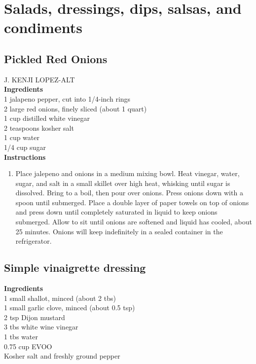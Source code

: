 \documentclass{article}
\numberwithin{figure}{section}
\numberwithin{equation}{section}
\begin{document}
\pagebreak
\section{Salads, dressings, dips, salsas, and condiments}

\pagebreak
\subsection{Pickled Red Onions}
J. KENJI LOPEZ-ALT\\

{\bf Ingredients}\\
1 jalapeno pepper, cut into 1/4-inch rings\\
2 large red onions, finely sliced (about 1 quart)\\
1 cup distilled white vinegar\\
2 teaspoons kosher salt\\
1 cup water\\
1/4 cup sugar\\

{\bf Instructions}
\begin{enumerate}
\item Place jalepeno and onions in a medium mixing bowl. Heat vinegar, water, sugar, and salt in a small skillet over high heat, whisking until sugar is dissolved. Bring to a boil, then pour over onions. Press onions down with a spoon until submerged. Place a double layer of paper towels on top of onions and press down until completely saturated in liquid to keep onions submerged. Allow to sit until onions are softened and liquid has cooled, about 25 minutes. Onions will keep indefinitely in a sealed container in the refrigerator.
\end{enumerate}



\pagebreak
\subsection{Simple vinaigrette dressing}
{\bf Ingredients}\\
1 small shallot, minced (about 2 tbs)\\
1 small garlic clove, minced (about 0.5 tsp)\\
2 tsp Dijon mustard\\
3 tbs white wine vinegar\\
1 tbs water\\
0.75 cup EVOO\\
Kosher salt and freshly ground pepper\\
\end{document}
